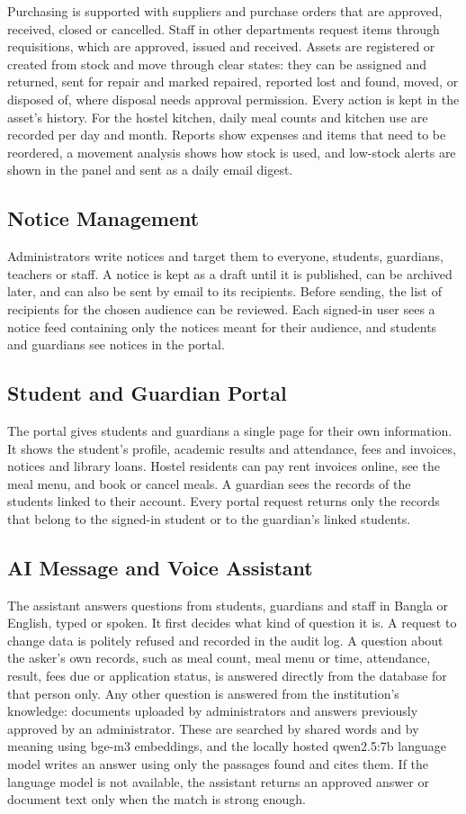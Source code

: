 Purchasing is supported with suppliers and purchase orders that are approved, received, closed or cancelled. Staff in other departments request items through requisitions, which are approved, issued and received. Assets are registered or created from stock and move through clear states: they can be assigned and returned, sent for repair and marked repaired, reported lost and found, moved, or disposed of, where disposal needs approval permission. Every action is kept in the asset's history. For the hostel kitchen, daily meal counts and kitchen use are recorded per day and month. Reports show expenses and items that need to be reordered, a movement analysis shows how stock is used, and low-stock alerts are shown in the panel and sent as a daily email digest.

\subsection{Notice Management}
Administrators write notices and target them to everyone, students, guardians, teachers or staff. A notice is kept as a draft until it is published, can be archived later, and can also be sent by email to its recipients. Before sending, the list of recipients for the chosen audience can be reviewed. Each signed-in user sees a notice feed containing only the notices meant for their audience, and students and guardians see notices in the portal.

\subsection{Student and Guardian Portal}
The portal gives students and guardians a single page for their own information. It shows the student's profile, academic results and attendance, fees and invoices, notices and library loans. Hostel residents can pay rent invoices online, see the meal menu, and book or cancel meals. A guardian sees the records of the students linked to their account. Every portal request returns only the records that belong to the signed-in student or to the guardian's linked students.

\subsection{AI Message and Voice Assistant}
The assistant answers questions from students, guardians and staff in Bangla or English, typed or spoken. It first decides what kind of question it is. A request to change data is politely refused and recorded in the audit log. A question about the asker's own records, such as meal count, meal menu or time, attendance, result, fees due or application status, is answered directly from the database for that person only. Any other question is answered from the institution's knowledge: documents uploaded by administrators and answers previously approved by an administrator. These are searched by shared words and by meaning using bge-m3 embeddings, and the locally hosted qwen2.5:7b language model writes an answer using only the passages found and cites them. If the language model is not available, the assistant returns an approved answer or document text only when the match is strong enough.

